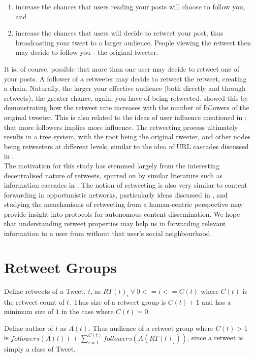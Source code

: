 \begin{enumerate}
\item increase the chances that users reading your posts will choose to follow you, and
\item increase the chances that users will decide to retweet your post, thus broadcasting your tweet to a larger audience. People viewing the retweet then may decide to follow you - the original tweeter. 
\end{enumerate}
It is, of course, possible that more than one user may decide to retweet one of your posts. A follower of a retweeter may decide to retweet the retweet, creating a chain. Naturally, the larger your effective audience (both directly and through retweets), the greater chance, again, you have of being retweeted. \cite{suh10} showed this by demonstrating how the retweet rate increases with the number of followers of the original tweeter. This is also related to the ideas of user influence mentioned in \cite{cha10}; that more followers implies more influence. The retweeting process ultimately results in a tree system, with the root being the original tweeter, and other nodes being retweeters at different levels, similar to the idea of URL cascades discussed in \cite{galuba10}.\\
The motivation for this study has stemmed largely from the interesting decentralised nature of retweets, spurred on by similar literature such as information cascades in \cite{galuba10}. The notion of retweeting is also very similar to content forwarding in opportunistic networks, particularly ideas discussed in \cite{allen10}, and studying the menchanisms of retweeting from a human-centric perspective may provide insight into protocols for autonomous content dissemination. We hope that understanding retweet properties may help us  in forwarding relevant information to a user from without that user's social neighbourhood.

\section{Retweet Groups}
Define retweets of a Tweet, $t$, as $RT(t)_i \: \forall \: 0 <= i <= C(t)$ where $C(t)$ is the retweet count of $t$. Thus size of a retweet group is $C(t)+1$ and has a minimum size of $1$ in the case where $C(t) = 0$.

Define author of $t$ as $A(t)$. Thus audience of a retweet group where $C(t) > 1$ is $followers(A(t)) + \sum\limits_{i=1}^{C(t)} followers(A(RT(t)_i))$, since a retweet is simply a class of Tweet.

